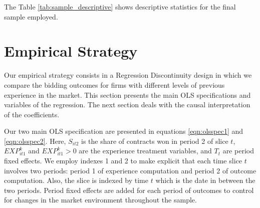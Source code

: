 

The Table \ref{tab:sample_descriptive} shows descriptive statistics for the final sample employed.



\section{Empirical Strategy}
Our empirical strategy consists in a Regression Discontinuity design in which we compare the bidding outcomes for firms with different levels of previous experience in the market. This section presents the main OLS specifications and variables of the regression. The next section deals with the causal interpretation of the coefficients.

Our two main OLS specification are presented in equations \ref{eqn:olsspec1} and \ref{eqn:olsspec2}. Here, $S_{it2}$ is the share of contracts won in period 2 of slice $t$, $EXP^k_{it1}$ and $EXP^k_{it1}>0$ are the experience treatment variables, and $T_t$ are period fixed effects. We employ indexes 1 and 2 to make explicit that each time slice $t$ involves two periods: period 1 of experience computation and period 2 of outcome computation. Also, the slice is indexed by time $t$ which is the date in between the two periods. Period fixed effects are added for each period of outcomes to control for changes in the market environment throughout the sample.

